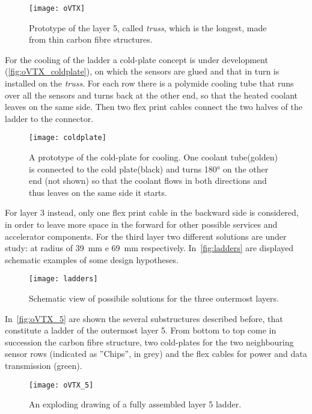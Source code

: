 \begin{figure}[h!]
\centering
\texttt{[image: oVTX]}
\caption{Prototype of the layer 5, called \textit{truss}, which is the longest, made from thin carbon fibre structures.}
\label{fig:oVTX}
\end{figure}


For the cooling of the ladder a cold-plate concept is under development (\autoref{fig:oVTX_coldplate}), on which the sensors are glued and that in turn is installed on the \textit{truss}. For each row there is a polymide cooling tube that runs over all the sensors and turns back at the other end, so that the heated coolant leaves on the same side. Then two flex print cables connect the two halves of the ladder to the connector.


\begin{figure}[h!]
\centering
\texttt{[image: coldplate]}
\caption{A prototype of the cold-plate for cooling. One coolant tube(golden) is connected to the cold plate(black) and turns \ang{180} on the other end (not shown) so that the coolant flows in both directions and thus leaves on the same side it starts.}
\label{fig:oVTX_coldplate}
\end{figure}

For layer 3 instead, only one flex print cable in the backward side is considered, in order to leave more space in the forward for other possible services and accelerator components. For the third layer two different solutions are under study: at radius of \SI{39}{mm} e \SI{69}{mm} respectively. 
In~\autoref{fig:ladders} are displayed schematic examples of some design hypotheses. 

\begin{figure}[h!]
\centering
\texttt{[image: ladders]}
\caption{Schematic view of possibile solutions for the three outermost layers.}
\label{fig:ladders}
\end{figure}


In~\autoref{fig:oVTX_5} are shown the several substructures described before, that constitute a ladder of the outermost layer 5. From bottom to top come in succession the carbon fibre structure, two cold-plates for the two neighbouring sensor rows (indicated as ''Chips'', in grey) and the flex cables for power and data transmission (green). 


\begin{figure}[h!]
\centering
\texttt{[image: oVTX\_5]}
\caption{An exploding drawing of a fully assembled layer 5 ladder.}
\label{fig:oVTX_5}
\end{figure}



